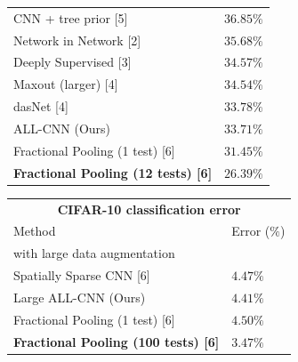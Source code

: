 \documentclass{article} %
\begin{document}
\begin{table}[h]
\begin{minipage}{0.49\linewidth}
\begin{tabular}{ll}
\hline
CNN + tree prior [5]         &  $36.85 \%$ \\ %
Network in Network [2]         &  $35.68 \%$ \\%
Deeply Supervised [3]         & $34.57 \%$  \\ %
Maxout (larger) [4]         &  $34.54 \%$ \\ %
dasNet [4]         &  $33.78 \%$ \\%
ALL-CNN (Ours)         &  $33.71 \%$ \\%
Fractional Pooling (1 test) [6]  & $\mathbf{31.45} \%$ \\
\textbf{Fractional Pooling (12 tests) [6]}  & $\mathbf{26.39} \%$ \\
\end{tabular}
\begin{tabular}{ll}
\multicolumn{2}{c}{\bf CIFAR-10 classification error} \\
\multicolumn{1}{l}{Method} & \multicolumn{1}{l}{Error ($\%$)} \\
\hline
\multicolumn{2}{l}{with large data augmentation} \\
\hline
Spatially Sparse CNN [6]         & $4.47 \%$  \\
Large ALL-CNN (Ours)         &  $4.41 \%$  \\
Fractional Pooling (1 test) [6]  & $4.50 \%$ \\
\textbf{Fractional Pooling (100 tests) [6]}  & $\mathbf{3.47} \%$ \\
\end{tabular}
\end{minipage}
\end{table}
\end{document}
